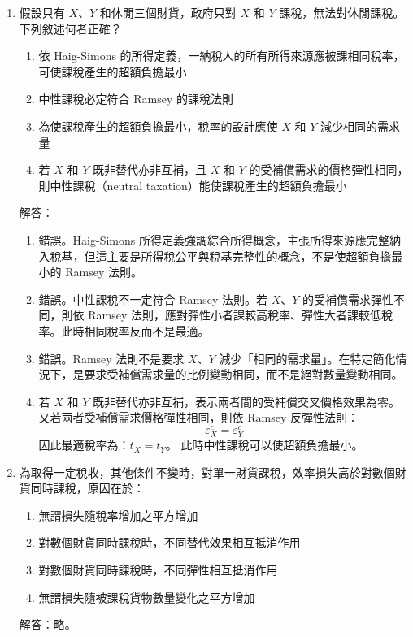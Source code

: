 \documentclass[12pt, a4paper]{article}
\begin{document}
\begin{enumerate}
    \item 假設只有 \(X\)、\(Y\) 和休閒三個財貨，政府只對 \(X\) 和 \(Y\) 課稅，無法對休閒課稅。下列敘述何者正確？
    \begin{enumerate}[label=\Alph*.]
        \item 依 Haig-Simons 的所得定義，一納稅人的所有所得來源應被課相同稅率，可使課稅產生的超額負擔最小
        \item 中性課稅必定符合 Ramsey 的課稅法則
        \item 為使課稅產生的超額負擔最小，稅率的設計應使 \(X\) 和 \(Y\) 減少相同的需求量
        \item 若 \(X\) 和 \(Y\) 既非替代亦非互補，且 \(X\) 和 \(Y\) 的受補償需求的價格彈性相同，則中性課稅（neutral taxation）能使課稅產生的超額負擔最小
    \end{enumerate}
    解答：
    \begin{enumerate}[label=\Alph*.]
        \item 錯誤。Haig-Simons 所得定義強調綜合所得概念，主張所得來源應完整納入稅基，但這主要是所得稅公平與稅基完整性的概念，不是使超額負擔最小的 Ramsey 法則。
        \item 錯誤。中性課稅不一定符合 Ramsey 法則。若 \(X\)、\(Y\) 的受補償需求彈性不同，則依 Ramsey 法則，應對彈性小者課較高稅率、彈性大者課較低稅率。此時相同稅率反而不是最適。
        \item 錯誤。Ramsey 法則不是要求 \(X\)、\(Y\) 減少「相同的需求量」。在特定簡化情況下，是要求受補償需求量的比例變動相同，而不是絕對數量變動相同。
        \item 若 \(X\) 和 \(Y\) 既非替代亦非互補，表示兩者間的受補償交叉價格效果為零。又若兩者受補償需求價格彈性相同，則依 Ramsey 反彈性法則：
        \[
        \varepsilon_X^c = \varepsilon_Y^c
        \]
        因此最適稅率為：$t_X = t_Y$。
        此時中性課稅可以使超額負擔最小。
    \end{enumerate}

    \item 為取得一定稅收，其他條件不變時，對單一財貨課稅，效率損失高於對數個財貨同時課稅，原因在於：
    \begin{enumerate}[label=\Alph*.]
        \item 無謂損失隨稅率增加之平方增加
        \item 對數個財貨同時課稅時，不同替代效果相互抵消作用
        \item 對數個財貨同時課稅時，不同彈性相互抵消作用
        \item 無謂損失隨被課稅貨物數量變化之平方增加
    \end{enumerate}
    解答：略。


\end{enumerate}
\end{document}
